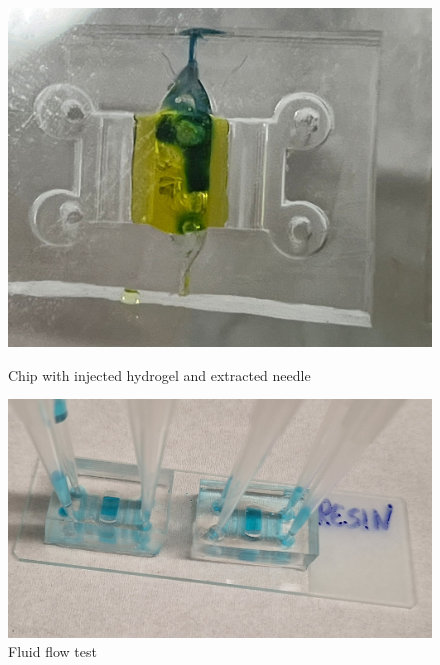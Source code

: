 \documentclass[letterpaper,12pt]{article}
\begin{document}
\begin{figure}[h!]
    \centering
    \begin{minipage}[b]{0.3\linewidth}
        \centering
        \includegraphics[width=\linewidth]{dapp_report/figures/Fig X 5;4.jpeg}
        \caption{Chip with injected hydrogel and extracted needle}
        \label{fig:X}
    \end{minipage}
    \hspace{0.03\linewidth}
    \begin{minipage}[t]{0.3\linewidth}
        \vspace{-4.6cm} %
        \centering
        \includegraphics[width=\linewidth]{dapp_report/figures/Fig Y 16;9.jpg}
        \caption{Fluid flow test}
        \label{fig:Y}
    \end{minipage}
    \hspace{0.03\linewidth}

\end{figure}
\end{document}
